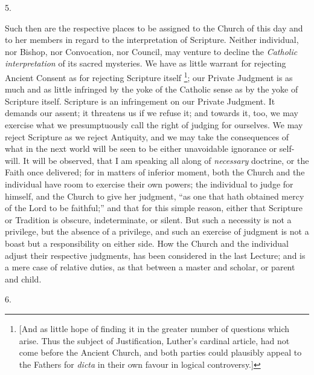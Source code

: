 5.

Such then are the respective places to be assigned to the Church of
this day and to her members in regard to the interpretation of
Scripture. Neither individual, nor Bishop, nor Convocation, nor
Council, may venture to decline the \emph{Catholic interpretation} of
its sacred mysteries. We have as little warrant for rejecting Ancient
Consent as for rejecting Scripture itself \footnote{[And as little hope of finding it in the
greater number of questions which arise. Thus the subject of
Justification, Luther's cardinal article, had not come before the
Ancient Church, and both parties could plausibly appeal to the Fathers
for \emph{dicta} in their own favour in logical controversy.]}; our Private Judgment is as much and as little infringed by the
yoke of the Catholic sense as by the yoke of Scripture itself.
Scripture is an infringement on our Private Judgment. It demands our
assent; it threatens us if we refuse it; and towards it, too, we may
exercise what we presumptuously call the right of judging for
ourselves. We may reject Scripture as we reject Antiquity, and we may
take the consequences of what in the next world will be seen to be
either unavoidable ignorance or self-will. It will be observed,
that I am speaking all along of \emph{necessary} doctrine, or the
Faith once delivered; for in matters of inferior moment, both the
Church and the individual have room to exercise their own powers; the
individual to judge for himself, and the Church to give her judgment,
``as one that hath obtained mercy of the Lord to be
faithful;'' and that for this simple reason, either that Scripture
or Tradition is obscure, indeterminate, or silent. But such a
necessity is not a privilege, but the absence of a privilege, and such
an exercise of judgment is not a boast but a responsibility on either
side. How the Church and the individual adjust their respective
judgments, has been considered in the last Lecture; and is a mere case
of relative duties, as that between a master and scholar, or parent
and child.

6.

